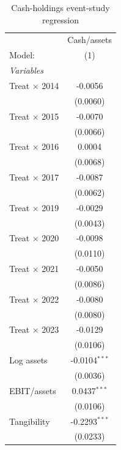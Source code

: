 \begin{table}[H]
   \caption{\label{tab:appendix_event_cash} Cash-holdings event-study regression}
   \centering
   \scriptsize
   \begin{tabular}{lc}
      \tabularnewline \midrule \midrule
                              & Cash/assets \\
      Model:                  & (1) \\
      \midrule
      \emph{Variables} \\
      Treat $\times$ 2014     & -0.0056 \\
                              & (0.0060) \\
      Treat $\times$ 2015     & -0.0070 \\
                              & (0.0066) \\
      Treat $\times$ 2016     & 0.0004 \\
                              & (0.0068) \\
      Treat $\times$ 2017     & -0.0087 \\
                              & (0.0062) \\
      Treat $\times$ 2019     & -0.0029 \\
                              & (0.0043) \\
      Treat $\times$ 2020     & -0.0098 \\
                              & (0.0110) \\
      Treat $\times$ 2021     & -0.0050 \\
                              & (0.0086) \\
      Treat $\times$ 2022     & -0.0080 \\
                              & (0.0080) \\
      Treat $\times$ 2023     & -0.0129 \\
                              & (0.0106) \\
      Log assets              & -0.0104$^{***}$ \\
                              & (0.0036) \\
      EBIT/assets             & 0.0437$^{***}$ \\
                              & (0.0106) \\
      Tangibility             & -0.2293$^{***}$ \\
                              & (0.0233) \\

\end{tabular}
\end{table}
